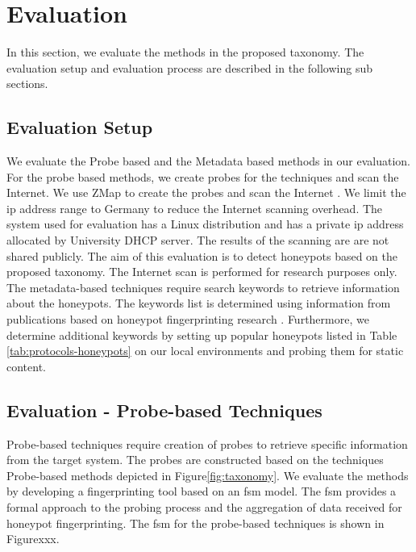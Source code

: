 \section{Evaluation}
\label{sec:eval}

In this section, we evaluate the methods in the proposed taxonomy. The evaluation setup and evaluation process are described in the following sub sections. 

\subsection{Evaluation Setup}
We evaluate the Probe based and the Metadata based methods in our evaluation. For the probe based methods, we create probes for the techniques and scan the Internet. We use ZMap to create the probes and scan the Internet \cite{zmap}. We limit the \acrshort{ip} address range to Germany to reduce the Internet scanning overhead. The system used for evaluation has a Linux distribution and has a private \acrshort{ip} address allocated by University DHCP server.  The results of the scanning are are not shared publicly. The aim of this evaluation is to detect honeypots based on the proposed taxonomy. The Internet scan is performed for research purposes only. The metadata-based techniques require search keywords to retrieve information about the honeypots. The keywords list is determined using information from publications based on honeypot fingerprinting research \cite{Vetterl2018} \cite{counting}. Furthermore, we determine additional keywords by setting up popular honeypots listed in Table \ref{tab:protocols-honeypots} on our local environments and probing them for static content.

\subsection{Evaluation - Probe-based Techniques}
Probe-based techniques require creation of probes to retrieve specific information from the target system. The probes are constructed based on the techniques Probe-based methods depicted in Figure\ref{fig:taxonomy}. We evaluate the methods by developing a fingerprinting tool based on an \acrfull{fsm} model. The \acrshort{fsm} provides a formal approach to the probing process and the aggregation of data received for honeypot fingerprinting. The \acrshort{fsm} for the probe-based techniques is shown in Figurexxx. 


